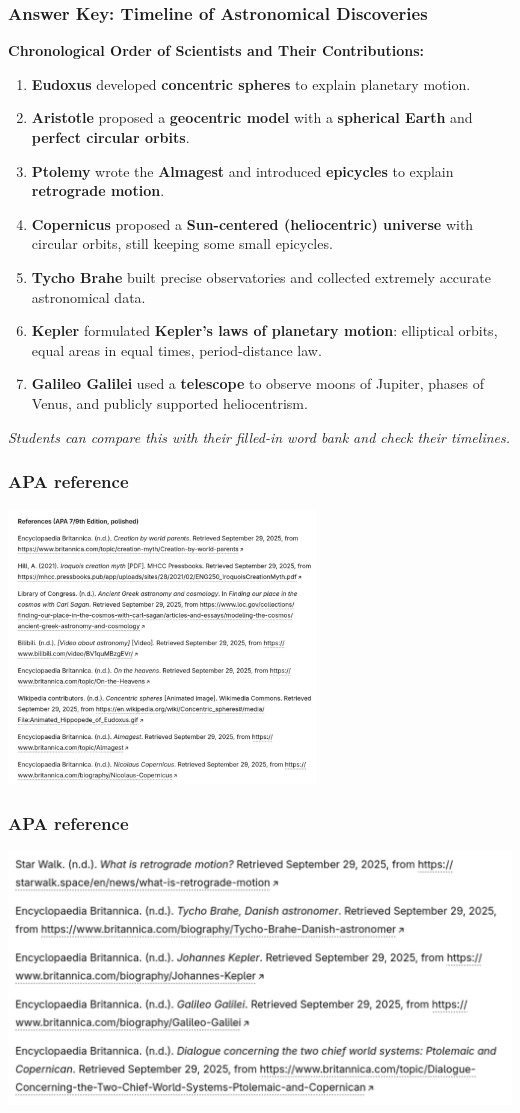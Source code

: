 \documentclass[aspectratio=1611, 9pt]{beamer}
\begin{document}
\begin{frame}
\frametitle{Answer Key: Timeline of Astronomical Discoveries}

\textbf{Chronological Order of Scientists and Their Contributions:}

\begin{enumerate}
    \item \textbf{Eudoxus} developed \textbf{concentric spheres} to explain planetary motion.  
    \item \textbf{Aristotle} proposed a \textbf{geocentric model} with a \textbf{spherical Earth} and \textbf{perfect circular orbits}.  
    \item \textbf{Ptolemy} wrote the \textbf{Almagest} and introduced \textbf{epicycles} to explain \textbf{retrograde motion}.  
    \item \textbf{Copernicus} proposed a \textbf{Sun-centered (heliocentric) universe} with circular orbits, still keeping some small epicycles.  
    \item \textbf{Tycho Brahe} built precise observatories and collected extremely accurate astronomical data.  
    \item \textbf{Kepler} formulated \textbf{Kepler's laws of planetary motion}: elliptical orbits, equal areas in equal times, period-distance law.  
    \item \textbf{Galileo Galilei} used a \textbf{telescope} to observe moons of Jupiter, phases of Venus, and publicly supported heliocentrism.  
\end{enumerate}

\vspace{0.3cm}
\textit{Students can compare this with their filled-in word bank and check their timelines.}
\end{frame}

\begin{frame}
\frametitle{APA reference}
\includegraphics[width=0.612\textwidth]{pictures/2025-09-29_20-52-43.png}
\end{frame}

\begin{frame}
  \frametitle{APA reference}
  \includegraphics[width=\textwidth]{pictures/2025-09-29_20-53-39.png}
\end{frame}
\end{document}
